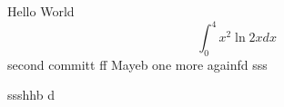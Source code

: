 \documentclass{article}
\begin{document}
Hello World
$$\int_0^4 x^2 \ln{2x}dx$$
second committ  ff
Mayeb
one more
againfd
sss

ssshhb d
\end{document}
